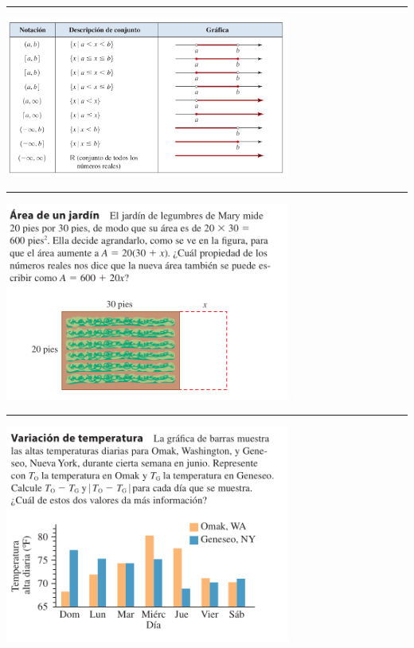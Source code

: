 \documentclass[
  letterpaper,
  DIV=11,
  numbers=noendperiod]{scrartcl}
\begin{document}
\begin{center}\rule{0.5\linewidth}{0.5pt}\end{center}

\includegraphics[width=0.7\textwidth,height=\textheight]{intervalos.png}

\begin{center}\rule{0.5\linewidth}{0.5pt}\end{center}

\includegraphics[width=0.7\textwidth,height=\textheight]{problema1.png}

\begin{center}\rule{0.5\linewidth}{0.5pt}\end{center}

\includegraphics[width=0.7\textwidth,height=\textheight]{problema2.png}
\end{document}
